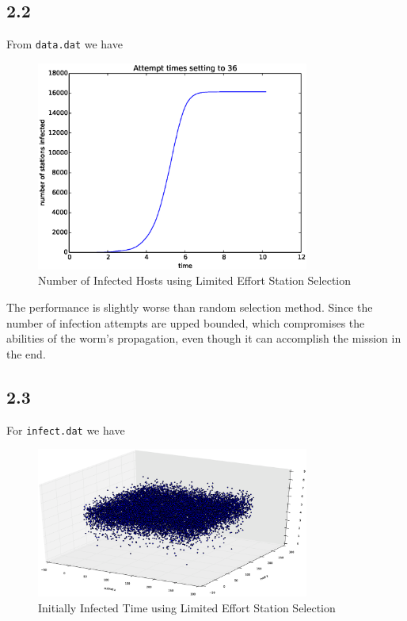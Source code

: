 \documentclass[10pt]{article}
\begin{document}
\subsection*{2.2}
From \texttt{data.dat} we have
\begin{figure}[H]
\begin{center}
\includegraphics[width=0.8\textwidth]{figure2.2.eps}
\caption{Number of Infected Hosts using Limited Effort Station Selection}
\end{center}
\end{figure}

The performance is slightly worse than random selection method. Since the number of infection attempts are upped bounded, which compromises the abilities of the worm's propagation, even though it can accomplish the mission in the end.

\subsection*{2.3}
For \texttt{infect.dat} we have

\begin{figure}[H]
\begin{center}
\includegraphics[width=0.8\textwidth]{figure2.3.eps}
\caption{Initially Infected Time using Limited Effort Station Selection}
\end{center}
\end{figure}
\end{document}
